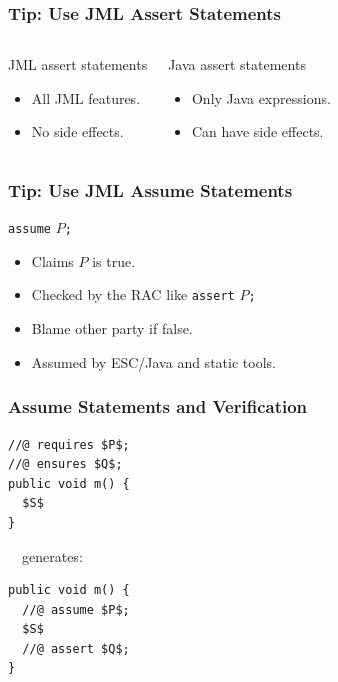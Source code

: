 \begin{frame}
\frametitle{Tip: Use JML Assert Statements}

\begin{columns}[t]
\begin{block}{JML assert statements}
\begin{itemize}
\item
All JML features.

\item
No side effects.
\end{itemize}
\end{block}

\begin{block}{Java assert statements}
\begin{itemize}
\item
Only Java expressions.

\item
Can have side effects.
\end{itemize}
\end{block}
\end{columns}

\end{frame}

\begin{frame}[fragile]
\frametitle{Tip: Use JML Assume Statements}

\lstinline!assume! $P$\texttt{;}

\begin{itemize}
\item
Claims $P$ is true.

\item
Checked by the RAC like \lstinline!assert! $P$\texttt{;}

\item
Blame other party if false.

\item
Assumed by ESC/Java and static tools.
\end{itemize}
\end{frame}

\begin{frame}[fragile]
\frametitle{Assume Statements and Verification}

\begin{lstlisting}[mathescape=true]
//@ requires $P$;
//@ ensures $Q$;
public void m() {
  $S$
}
\end{lstlisting}

~~generates:

\begin{lstlisting}[mathescape=true]
public void m() {
  //@ assume $P$;
  $S$
  //@ assert $Q$;
}
\end{lstlisting}
\end{frame}

